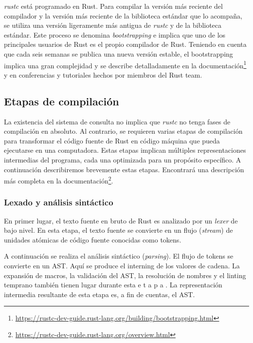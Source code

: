 \emph{rustc} está programado en Rust. Para compilar la versión más reciente del compilador y la
versión más reciente de la biblioteca estándar que lo acompaña, se utiliza una versión
ligeramente más antigua de \emph{rustc} y de la biblioteca estándar. Este proceso se denomina
\emph{bootstrapping} e implica que uno de los principales usuarios de Rust es el propio compilador de
Rust. Teniendo en cuenta que cada seis semanas se publica una nueva versión estable, el
bootstrapping implica una gran complejidad y se describe detalladamente
en la documentación\footnote{\url{https://rustc-dev-guide.rust-lang.org/building/bootstrapping.html}}
y en conferencias \cite{nelson2022} y tutoriales \cite{klock2022} hechos por miembros del Rust team.

\subsection{Etapas de compilación}

La existencia del sistema de consulta no implica que \emph{rustc} no tenga fases de compilación en
absoluto. Al contrario, se requieren varias etapas de compilación para transformar el código
fuente de Rust en código máquina que pueda ejecutarse en una computadora. Estas etapas implican
múltiples representaciones intermedias del programa, cada una optimizada para un propósito
específico. A continuación describiremos brevemente estas etapas. Encontrará una descripción
más completa en la documentación\footnote{\url{https://rustc-dev-guide.rust-lang.org/overview.html}}.

\subsubsection{Lexado y análisis sintáctico}

En primer lugar, el texto fuente en bruto de Rust es analizado por un \emph{lexer} de bajo nivel.
En esta etapa, el texto fuente se convierte en un flujo (\textit{stream}) de unidades atómicas de código fuente
conocidas como tokens.

A continuación se realiza el análisis sintáctico (\textit{parsing}).
El flujo de tokens se convierte en un \acrshort{AST}.
Aquí se produce el interning de los valores de cadena. La expansión de macros, la validación del
\acrshort{AST}, la resolución de nombres y el linting temprano también tienen lugar durante esta e t a p a .
La representación intermedia resultante de esta etapa es, a fin de cuentas, el \acrshort{AST}.

